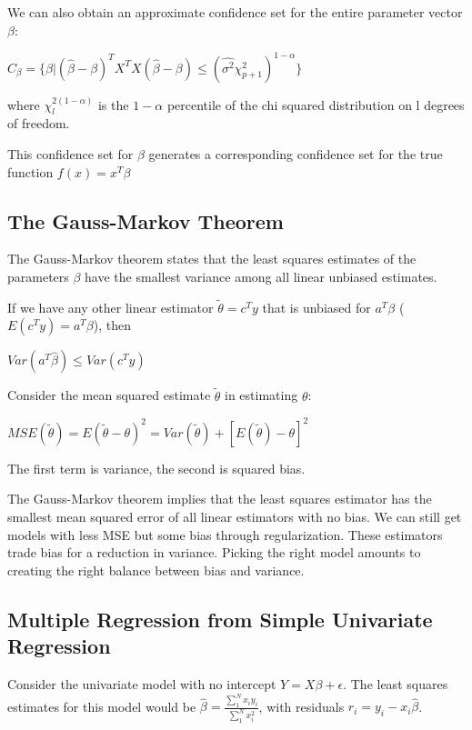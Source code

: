 \documentclass[11pt]{article}
\begin{document}
We can also obtain an approximate confidence set for the entire parameter vector \(\beta\): 

\(C_{\beta} = \{\beta | (\hat{\beta} - \beta)^T X^TX(\hat{\beta} - \beta) \leq (\hat{\sigma^2}\chi_{p + 1}^2)^{1 - \alpha}\}\)

where \(\chi_l^{2(1-\alpha)}\) is the \(1 - \alpha\) percentile of the chi squared distribution on l degrees of freedom. 

This confidence set for \(\beta\) generates a corresponding confidence set for the true function \(f(x) = x^T\beta\)

\subsection{The Gauss-Markov Theorem}
\label{sec:org21a7d30}

The Gauss-Markov theorem states that the least squares estimates of the parameters \(\beta\) have the smallest variance among all linear unbiased estimates.

If we have any other linear estimator \(\tilde{\theta} = c^Ty\) that is unbiased for \(a^T\beta\) (\(E(c^Ty) = a^T\beta\)), then 

\(Var(a^T\hat{\beta}) \leq Var(c^Ty)\)

Consider the mean squared estimate \(\tilde{\theta}\) in estimating \(\theta\):

\(MSE(\tilde{\theta}) = E(\tilde{\theta} -\theta)^2 = Var(\tilde{\theta}) + [E(\tilde{\theta}) - \theta]^2\)

The first term is variance, the second is squared bias. 

The Gauss-Markov theorem implies that the least squares estimator has the smallest mean squared error of all linear estimators with no bias. We can still get models with less MSE but some bias through regularization. These estimators trade bias for a reduction in variance. Picking the right model amounts to creating the right balance between bias and variance. 

\subsection{Multiple Regression from Simple Univariate Regression}
\label{sec:org83ce5ff}

Consider the univariate model with no intercept \(Y = X\beta + \epsilon\). The least squares estimates for this model would be \(\hat{\beta} = \frac{\sum_1^N x_i y_i}{\sum_1^N x_i^2}\), with residuals \(r_i = y_i - x_i \hat{\beta}\). 
\end{document}

